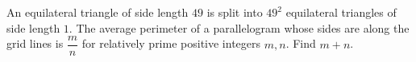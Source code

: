 An equilateral triangle of side length $49$ is split into $49^2$ equilateral triangles of side length $1$. The average perimeter of a parallelogram whose sides are along the grid lines is $\dfrac{m}{n}$ for relatively prime positive integers $m, n$. Find $m + n$.
